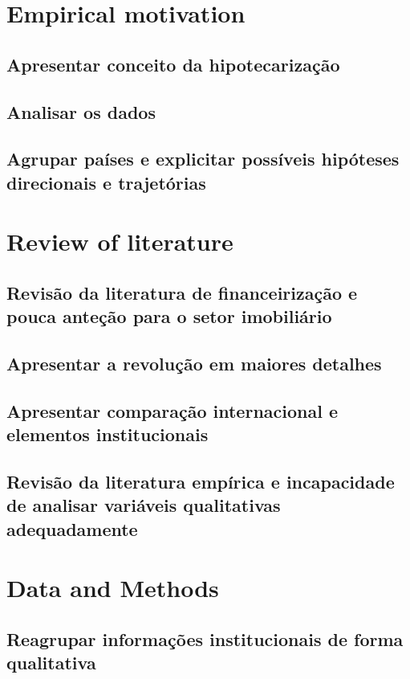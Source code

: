 \documentclass{SelfArx}
\begin{document}
\section*{Empirical motivation}
\label{sec:orga5d2322}
\subsection*{Apresentar conceito da hipotecarização}
\label{sec:org5ae8057}
\subsection*{Analisar os dados}
\label{sec:org2e4fe1e}
\subsection*{Agrupar países e explicitar possíveis hipóteses direcionais e trajetórias}
\label{sec:orgcfc2b4c}
\section*{Review of literature}
\label{sec:orgf3eedd6}
\subsection*{Revisão da literatura de financeirização e pouca anteção para o setor imobiliário}
\label{sec:org62ec32f}
\subsection*{Apresentar a revolução em maiores detalhes}
\label{sec:orgaa39878}
\subsection*{Apresentar comparação internacional e elementos institucionais}
\label{sec:org2a156c3}
\subsection*{Revisão da literatura empírica e incapacidade de analisar variáveis qualitativas adequadamente}
\label{sec:org414fdb6}
\section*{Data and Methods}
\label{sec:org71a98b9}
\subsection*{Reagrupar informações institucionais de forma qualitativa}
\label{sec:org5a0cd3b}
\end{document}
